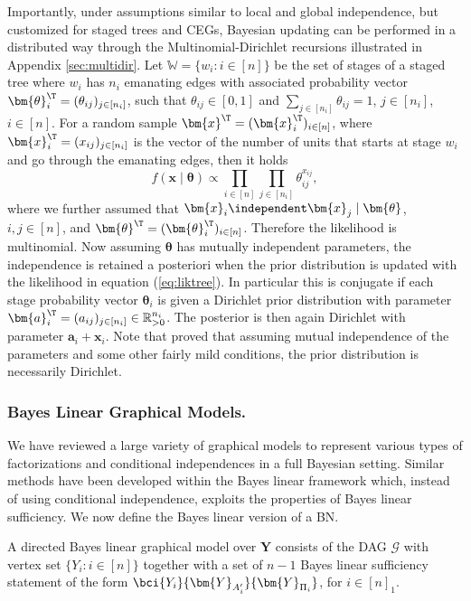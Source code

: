 Importantly, under assumptions similar to local and global independence, but customized for staged trees and \glspl{CEG}, Bayesian updating can be performed in a distributed way through the Multinomial-Dirichlet recursions illustrated in Appendix \ref{sec:multidir}. Let $\mathbb{W}=\{w_i: i\in [n]\}$ be the set of stages of a staged tree where $w_i$ has $n_i$ emanating edges with associated probability vector $\bm{\theta}_i^\T=(\theta_{ij})_{j\in[n_i]}$, such that $\theta_{ij}\in[0,1]$ and $\sum_{j\in[n_i]}\theta_{ij}=1$, $j\in[n_i]$, $i\in[n]$. For a random sample $\bm{x}^\T=(\bm{x}_i^\T)_{i\in[n]}$, where $\bm{x}_i^\T=(x_{ij})_{j\in[n_i]}$ is the vector of the number of units that starts at stage $w_i$ and go through the emanating edges, then it holds
\begin{equation}
\label{eq:liktree}
f(\bm{x}\;|\;\bm{\theta})\propto\prod_{i\in[n]}\prod_{j\in[n_i]}\theta_{ij}^{x_{ij}},
\end{equation}
where we further assumed that $\bm{x}_i\independent \bm{x}_j\;|\;\bm{\theta}$, $i,j\in[n]$, and $\bm{\theta}^\T=(\bm{\theta}_i^\T)_{i\in[n]}$. Therefore the likelihood is multinomial. Now assuming $\bm{\theta}$ has mutually independent parameters, the independence  is retained a posteriori when the prior distribution is updated with the likelihood in equation (\ref{eq:liktree}). In particular this is conjugate if each stage probability vector $\bm{\theta}_i$ is given a Dirichlet prior distribution with parameter $\bm{a}_i^\T=(a_{ij})_{j\in[n_i]}\in\mathbb{R}^{n_i}_{>0}$. The posterior is then again Dirichlet with parameter $\bm{a}_i+\bm{x}_i$. Note that \citet{Freeman2011} proved that assuming mutual independence of the parameters and some other fairly mild conditions, the prior distribution is necessarily Dirichlet.

\subsubsection{Bayes Linear Graphical Models.}
\label{sec:lineargraphs}
We have reviewed a large variety of graphical models to represent various types of factorizations and conditional independences in a full Bayesian setting. Similar methods have been developed within the Bayes linear framework which, instead of using conditional independence, exploits the properties of Bayes linear sufficiency.  We now define the Bayes linear version of a \gls{BN}.

\begin{definition}
 A directed Bayes linear graphical model over $\bm{Y}$ consists of the \gls{DAG} $\mathcal{G}$ with vertex set $\{Y_i: i\in[n]\}$ together with a set of $n-1$ Bayes linear sufficiency statement of the form $\bci{Y_i}{\bm{Y}_{A_i'}}{\bm{Y}_{\Pi_i}}$, for $i\in[n]_1$.
\end{definition}


